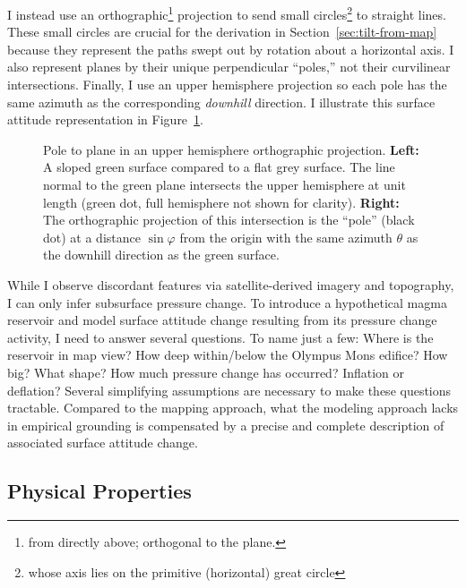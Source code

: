 I instead use an orthographic\footnote{from directly above; orthogonal to the plane.} projection to send small circles\footnote{whose axis lies on the primitive (horizontal) great circle} to straight lines. These small circles are crucial for the derivation in Section~\ref{sec:tilt-from-map} because they represent the paths swept out by rotation about a horizontal axis. I also represent planes by their unique perpendicular ``poles,'' not their curvilinear intersections. Finally, I use an upper hemisphere projection so each pole has the same azimuth as the corresponding \emph{downhill} direction. I illustrate this surface attitude representation in Figure~\ref{fig:surface}.

\begin{figure}
    \caption[Orthographic pole to plane]{Pole to plane in an upper hemisphere orthographic projection. \textbf{Left:} A sloped green surface compared to a flat grey surface. The line normal to the green plane intersects the upper hemisphere at unit length (green dot, full hemisphere not shown for clarity). \textbf{Right:} The orthographic projection of this intersection is the ``pole'' (black dot) at a distance $\sin\varphi$ from the origin with the same azimuth $\theta$ as the downhill direction as the green surface.}%
    \label{fig:surface}%
\end{figure}


While I observe discordant features via satellite-derived imagery and topography, I can only infer subsurface pressure change. To introduce a hypothetical magma reservoir and model surface attitude change resulting from its pressure change activity, I need to answer several questions. To name just a few: Where is the reservoir in map view? How deep within/below the Olympus Mons edifice? How big? What shape? How much pressure change has occurred? Inflation or deflation? Several simplifying assumptions are necessary to make these questions tractable. Compared to the mapping approach, what the modeling approach lacks in empirical grounding is compensated by a precise and complete description of associated surface attitude change.

\subsection{Physical Properties}

